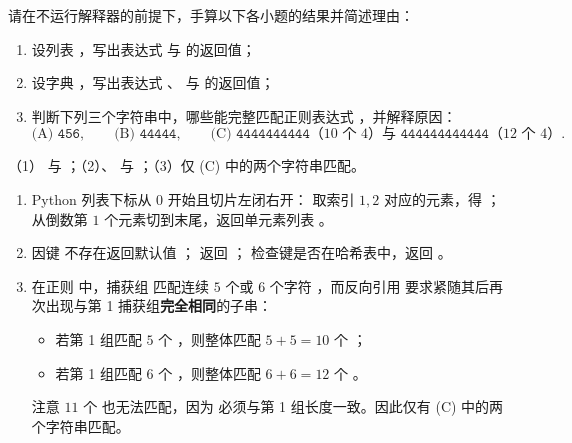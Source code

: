 \begin{exercise}[title={Python 切片、字典与正则表达式手算},level=standard,points=15,tags={Python,切片,正则表达式}]
请在不运行解释器的前提下，手算以下各小题的结果并简述理由：
\begin{enumerate}
  \item 设列表 ，写出表达式  与  的返回值；
  \item 设字典 ，写出表达式 、 与  的返回值；
  \item 判断下列三个字符串中，哪些能完整匹配正则表达式 ，并解释原因：
  \[
    \text{(A) }\texttt{456},\qquad
    \text{(B) }\texttt{44444},\qquad
    \text{(C) }\texttt{4444444444}\text{（10 个 4）与 }\texttt{444444444444}\text{（12 个 4）}.
  \]
\end{enumerate}
\begin{answer}
（1）\lcinline{[789, 2.23]} 与 \lcinline{[70.2]}；（2）、 与 ；（3）仅 (C) 中的两个字符串匹配。
\end{answer}
\begin{solution}
\begin{enumerate}
  \item Python 列表下标从 $0$ 开始且切片左闭右开： 取索引 $1,2$ 对应的元素，得 \lcinline{[789, 2.23]}； 从倒数第 $1$ 个元素切到末尾，返回单元素列表 \lcinline{[70.2]}。
  \item {} 因键  不存在返回默认值 ； 返回 ； 检查键是否在哈希表中，返回 。
  \item 在正则  中，捕获组  匹配连续 $5$ 个或 $6$ 个字符 ，而反向引用  要求紧随其后再次出现与第 1 捕获组\textbf{完全相同}的子串：
  \begin{itemize}
    \item 若第 1 组匹配 $5$ 个 ，则整体匹配 $5+5=10$ 个 ；
    \item 若第 1 组匹配 $6$ 个 ，则整体匹配 $6+6=12$ 个 。
  \end{itemize}
  注意 $11$ 个  也无法匹配，因为  必须与第 1 组长度一致。因此仅有 (C) 中的两个字符串匹配。
\end{enumerate}
\end{solution}
\end{exercise}

